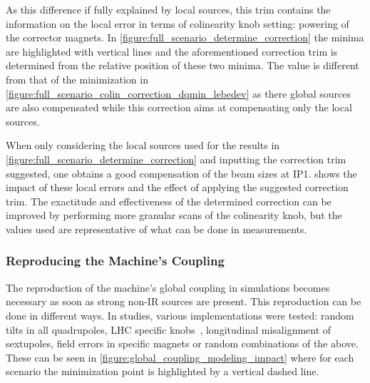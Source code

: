 As this difference if fully explained by local sources, this trim contains the information on the local error in terms of colinearity knob setting: powering of the corrector magnets.
In \cref{figure:full_scenario_determine_correction} the minima are highlighted with vertical lines and the aforementioned correction trim is determined from the relative position of these two minima.
The value is different from that of the minimization in \cref{figure:full_scenario_colin_correction_dqmin_lebedev} as there global sources are also compensated while this correction aims at compensating only the local sources.

When only considering the local sources used for the results in \cref{figure:full_scenario_determine_correction} and inputting the correction trim suggested, one obtains a good compensation of the beam sizes at IP\num{1}.
 shows the impact of these local errors and the effect of applying the suggested correction trim.
The exactitude and effectiveness of the determined correction can be improved by performing more granular scans of the colinearity knob, but the values used are representative of what can be done in measurements.

\subsubsection*{Reproducing the Machine's Coupling}

The reproduction of the machine's global coupling in simulations becomes necessary as soon as strong non-IR sources are present.
This reproduction can be done in different ways.
In studies, various implementations were tested: random tilts in all quadrupoles, LHC specific knobs~\cite{CERN:Tomas:Optimizing_Global_Coupling_Knobs_LHC}, longitudinal misalignment of sextupoles, field errors in specific magnets or random combinations of the above.
These can be seen in \cref{figure:global_coupling_modeling_impact} where for each scenario the minimization point is highlighted by a vertical dashed line.

